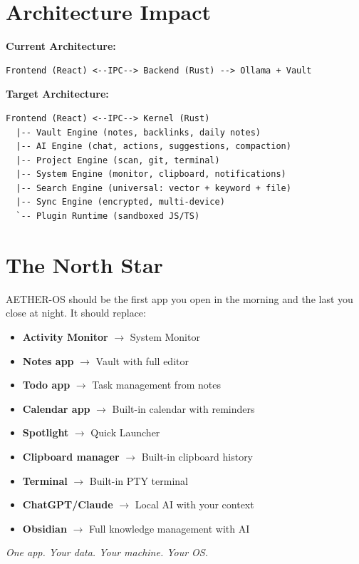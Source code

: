 \documentclass[11pt,a4paper]{article}
\begin{document}
\section{Architecture Impact}

\textbf{Current Architecture:}
\begin{verbatim}
Frontend (React) <--IPC--> Backend (Rust) --> Ollama + Vault
\end{verbatim}

\textbf{Target Architecture:}
\begin{verbatim}
Frontend (React) <--IPC--> Kernel (Rust)
  |-- Vault Engine (notes, backlinks, daily notes)
  |-- AI Engine (chat, actions, suggestions, compaction)
  |-- Project Engine (scan, git, terminal)
  |-- System Engine (monitor, clipboard, notifications)
  |-- Search Engine (universal: vector + keyword + file)
  |-- Sync Engine (encrypted, multi-device)
  `-- Plugin Runtime (sandboxed JS/TS)
\end{verbatim}

\section{The North Star}

AETHER-OS should be the first app you open in the morning and the last you close at night. It should replace:

\begin{itemize}[noitemsep]
  \item \textbf{Activity Monitor} $\rightarrow$ System Monitor
  \item \textbf{Notes app} $\rightarrow$ Vault with full editor
  \item \textbf{Todo app} $\rightarrow$ Task management from notes
  \item \textbf{Calendar app} $\rightarrow$ Built-in calendar with reminders
  \item \textbf{Spotlight} $\rightarrow$ Quick Launcher
  \item \textbf{Clipboard manager} $\rightarrow$ Built-in clipboard history
  \item \textbf{Terminal} $\rightarrow$ Built-in PTY terminal
  \item \textbf{ChatGPT/Claude} $\rightarrow$ Local AI with your context
  \item \textbf{Obsidian} $\rightarrow$ Full knowledge management with AI
\end{itemize}

\vspace{1cm}
\begin{center}
\Large \textit{One app. Your data. Your machine. Your OS.}
\end{center}
\end{document}
